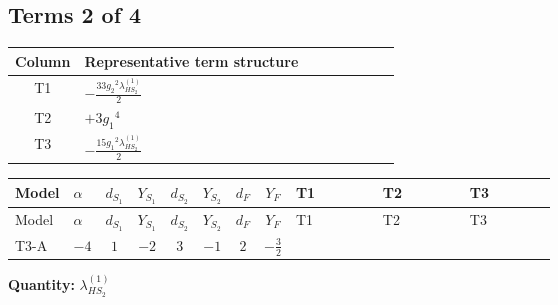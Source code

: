 \documentclass[8pt]{article}
\begin{document}
\begin{landscape}
\subsection*{Terms 2 of 4}
\begin{center}
\begin{tabular}{@{}c >{\raggedright\arraybackslash}p{0.82\linewidth}@{}}
\toprule
Column & Representative term structure \\
\midrule
T1 & \(\displaystyle -\frac{33 {g_2}^2 {\lambda_{HS_2}^{(1)}}}{2}\) \\
\midrule
T2 & \(\displaystyle +3 {g_1}^4\) \\
\midrule
T3 & \(\displaystyle -\frac{15 {g_1}^2 {\lambda_{HS_2}^{(1)}}}{2}\) \\
\midrule
\bottomrule
\end{tabular}
\end{center}
\smallskip
\tiny
\begin{longtable}{@{}llcccccc >{\raggedright\arraybackslash}p{0.21\linewidth} >{\raggedright\arraybackslash}p{0.21\linewidth} >{\raggedright\arraybackslash}p{0.21\linewidth}@{}}
\toprule
Model & $\alpha$ & $d_{S_1}$ & $Y_{S_1}$ & $d_{S_2}$ & $Y_{S_2}$ & $d_F$ & $Y_F$ & T1 & T2 & T3 \\
\midrule
\endfirsthead
\toprule
Model & $\alpha$ & $d_{S_1}$ & $Y_{S_1}$ & $d_{S_2}$ & $Y_{S_2}$ & $d_F$ & $Y_F$ & T1 & T2 & T3 \\
\midrule
\endhead
T3-A & $-4$ & $1$ & $-2$ & $3$ & $-1$ & $2$ & $-\frac{3}{2}$ & \scriptsize\adjustbox{max width=\linewidth}{$\begin{gathered} -\frac{33 {g_2}^2 {\lambda_{HS_2}^{(1)}}}{2}\end{gathered}$} & \scriptsize\adjustbox{max width=\linewidth}{$\begin{gathered} +3 {g_1}^4\end{gathered}$} & \scriptsize\adjustbox{max width=\linewidth}{$\begin{gathered} -\frac{15 {g_1}^2 {\lambda_{HS_2}^{(1)}}}{2}\end{gathered}$} \\
\midrule
\bottomrule
\end{longtable}
\clearpage
\noindent\textbf{Quantity: }$\lambda_{HS_2}^{(1)}$\par\smallskip

\end{landscape}
\end{document}
